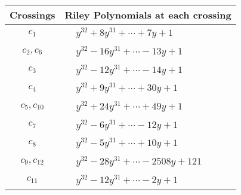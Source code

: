 \documentclass[1p]{elsarticle_modified}
\theoremstyle{definition}
\begin{document}
\begin{tabular}{m{50pt}|m{274pt}}
Crossings & \hspace{64pt}Riley Polynomials at each crossing \\
\hline $$\begin{aligned}c_{1}\end{aligned}$$&$\begin{aligned}
&y^{32}+8 y^{31}+\cdots+7 y+1
\end{aligned}$\\
\hline $$\begin{aligned}c_{2},c_{6}\end{aligned}$$&$\begin{aligned}
&y^{32}-16 y^{31}+\cdots-13 y+1
\end{aligned}$\\
\hline $$\begin{aligned}c_{3}\end{aligned}$$&$\begin{aligned}
&y^{32}-12 y^{31}+\cdots-14 y+1
\end{aligned}$\\
\hline $$\begin{aligned}c_{4}\end{aligned}$$&$\begin{aligned}
&y^{32}+9 y^{31}+\cdots+30 y+1
\end{aligned}$\\
\hline $$\begin{aligned}c_{5},c_{10}\end{aligned}$$&$\begin{aligned}
&y^{32}+24 y^{31}+\cdots+49 y+1
\end{aligned}$\\
\hline $$\begin{aligned}c_{7}\end{aligned}$$&$\begin{aligned}
&y^{32}-6 y^{31}+\cdots-12 y+1
\end{aligned}$\\
\hline $$\begin{aligned}c_{8}\end{aligned}$$&$\begin{aligned}
&y^{32}-5 y^{31}+\cdots+10 y+1
\end{aligned}$\\
\hline $$\begin{aligned}c_{9},c_{12}\end{aligned}$$&$\begin{aligned}
&y^{32}-28 y^{31}+\cdots-2508 y+121
\end{aligned}$\\
\hline $$\begin{aligned}c_{11}\end{aligned}$$&$\begin{aligned}
&y^{32}-12 y^{31}+\cdots-2 y+1
\end{aligned}$\\
\hline
\end{tabular}\\~\\
\end{document}
